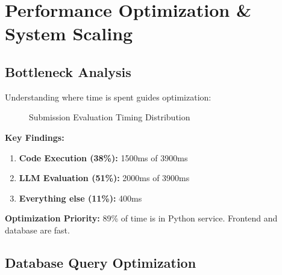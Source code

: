 \documentclass[12pt,a4paper,oneside]{article}
\begin{document}
\section{Performance Optimization \& System Scaling}

\subsection{Bottleneck Analysis}

Understanding where time is spent guides optimization:

\begin{figure}[H]
\centering
{}
\caption{Submission Evaluation Timing Distribution}
\label{fig:bottleneck}
\end{figure}

\textbf{Key Findings:}

\begin{enumerate}
    \item \textbf{Code Execution (38\%):} 1500ms of 3900ms
    \item \textbf{LLM Evaluation (51\%):} 2000ms of 3900ms
    \item \textbf{Everything else (11\%):} 400ms
\end{enumerate}

\textbf{Optimization Priority:} 89\% of time is in Python service. Frontend and database are fast.

\subsection{Database Query Optimization}
\end{document}
